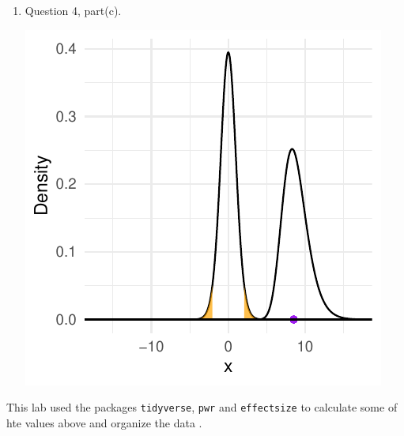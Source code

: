 \documentclass{article}\usepackage[]{graphicx}\usepackage[]{xcolor}
\makeatletter
\def\maxwidth{ %
  \ifdim\Gin@nat@width>\linewidth
    \linewidth
  \else
    \Gin@nat@width
  \fi
}
\newenvironment{knitrout}{}{} %
\makeatother
\begin{document}
\begin{enumerate}
\begin{enumerate}
  \item Question 4, part(c).
\begin{center}
\begin{knitrout}
\color{fgcolor}
\includegraphics[width=\maxwidth]{figure/unnamed-chunk-12-1} 
\end{knitrout}
\end{center}
\end{enumerate}
This lab used the packages \texttt{tidyverse}, \texttt{pwr} and \texttt{effectsize} to calculate some of hte values above and organize the data \citep{tidyverse} \citep{pwr} \citep{effectsize}. 
\end{enumerate}



\end{document}
